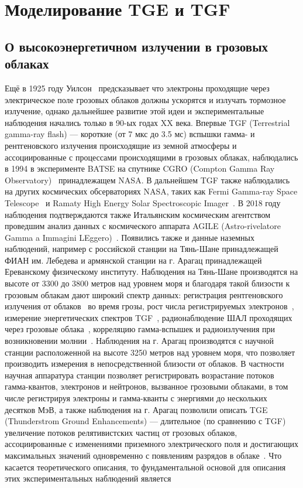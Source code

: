 \chapter{Моделирование TGE и TGF
}\label{ch:thunderstorm}

\section{О высокоэнергетичном излучении в грозовых облаках}\label{sec:thunderstorm/review}
Ещё в 1925 году Уилсон~\cite{wilson1925acceleration} предсказывает что электроны проходящие через электрическое поле грозовых облаков должны ускорятся и излучать тормозное излучение, однако дальнейшее развитие этой идеи и экспериментальные наблюдения начались только в 90-ых годах XX века. Впервые TGF (Terrestrial gamma-ray flash) --- короткие (от 7 мкс до 3.5 мс) вспышки гамма- и рентгеновского излучения происходящие из земной атмосферы и ассоциированные с процессами происходящими в грозовых облаках, наблюдались в 1994 в эксперименте BATSE на спутнике CGRO (Compton Gamma Ray Observatory)~\cite{Fishman1313} принадлежащем NASA. В дальнейшем TGF также наблюдались на других космических обсерваториях NASA, таких как Fermi Gamma-ray Space Telescope~\cite{briggs2010first} и Ramaty High Energy Solar Spectroscopic Imager~\cite{Smith1085}. В 2018 году наблюдения подтверждаются также Итальянским космическим агентством проведшим анализ данных с космического аппарата AGILE (Astro-rivelatore Gamma a Immagini LEggero)~\cite{lindanger2018search}. Появились также и данные наземных наблюдений, например с российской станции на Тянь-Шане принадлежащей ФИАН им. Лебедева и армянской станции на г. Арагац принадлежащей Ереванскому физическому институту. Наблюдения на Тянь-Шане производятся на высоте от 3300 до 3800 метров над уровнем моря и благодаря такой близости к грозовым облакам дают широкий спектр данных: регистрация рентгеновского излучения от облаков~\cite{chubenko2000} во время грозы, рост числа регистрируемых электронов~\cite{chubenko2003}, измерение энергетических спектров TGF~\cite{chubenko2009, gurevich2011effective}, радионаблюдение ШАЛ проходящих через грозовые облака~\cite{antonova2007, antonova2009, gurevich2002radio, gurevich2003radio}, корреляцию гамма-вспышек и радиоизлучения при возникновении молнии~\cite{gurevich2013correlation}. Наблюдения на г. Арагац производятся с научной станции расположенной на высоте 3250 метров над уровнем моря, что позволяет производить измерения в непосредственной близости от облаков. В частности научная аппаратура станции позволяет регистрировать возрастание потоков гамма-квантов, электронов и нейтронов, вызванное грозовыми облаками, в том числе регистрируя электроны и гамма-кванты с энергиями до нескольких десятков МэВ, а также наблюдения на г. Арагац позволили описать TGE (Thunderstrom Ground Enhancements) --- длительное (по сравнению с TGF) увеличение потоков релятивистских частиц от грозовых облаков, ассоциированные с изменениями приземного электрического поля и достигающих максимальных значений одновременно с появлениям разрядов в облаке~\cite{PhysRevD.83.062001, PhysRevD.82.043009}. Что касается теоретического описания, то фундаментальной основой для описания этих экспериментальных наблюдений является 